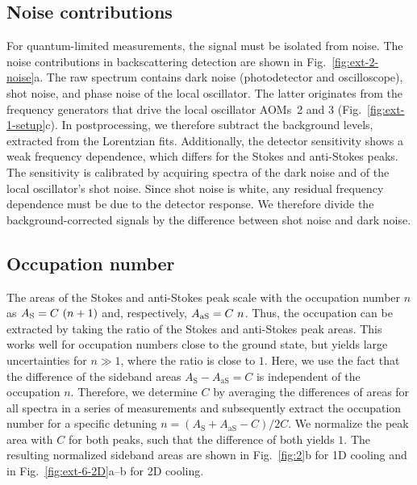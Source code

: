 \documentclass[reprint, amsmath, amssymb, superscriptaddress,showkeys,aps,pra]{revtex4-2}
\begin{document}
\subsection{Noise contributions}
\label{meth:calc_of_occ}
For quantum-limited measurements, the signal must be isolated from noise. The noise contributions in backscattering detection are shown in Fig.~\ref{fig:ext-2-noise}a. The raw spectrum contains dark noise (photodetector and oscilloscope), shot noise, and phase noise of the local oscillator. The latter originates from the frequency generators that drive the local oscillator AOMs~2 and 3 (Fig.~\ref{fig:ext-1-setup}c). In postprocessing, we therefore subtract the background levels, extracted from the Lorentzian fits. Additionally, the detector sensitivity shows a weak frequency dependence, which differs for the Stokes and anti-Stokes peaks. The sensitivity is calibrated by acquiring spectra of the dark noise and of the local oscillator's shot noise. Since shot noise is white, any residual frequency dependence must be due to the detector response. We therefore divide the background-corrected signals by the difference between shot noise and dark noise.

\subsection{Occupation number}
The areas of the Stokes and anti-Stokes peak scale with the occupation number $n$ as $A_{\rm S}=C~(n+1)$ and, respectively, $A_{\rm aS}=C~n$. Thus, the occupation can be extracted by
taking the ratio of the Stokes and anti-Stokes peak areas. This works well for occupation numbers close to the ground state, but yields large uncertainties for $n \gg 1$, where the ratio is close to $1$. Here, we use the fact that the difference of the sideband areas $A_{\mathrm{S}} - A_{\mathrm{aS}} = C$ is independent of the occupation $n$. Therefore, we determine $C$ by averaging the differences of areas for all spectra in a series of measurements and subsequently extract the occupation number for a specific detuning $n = (A_{\mathrm{S}} + A_{\mathrm{aS}} - C) / 2C$. We normalize the peak area with $C$ for both peaks, such that the difference of both yields $1$. The resulting normalized sideband areas are shown in Fig.~\ref{fig:2}b for 1D cooling and in Fig.~\ref{fig:ext-6-2D}a--b for 2D cooling.

\end{document}
